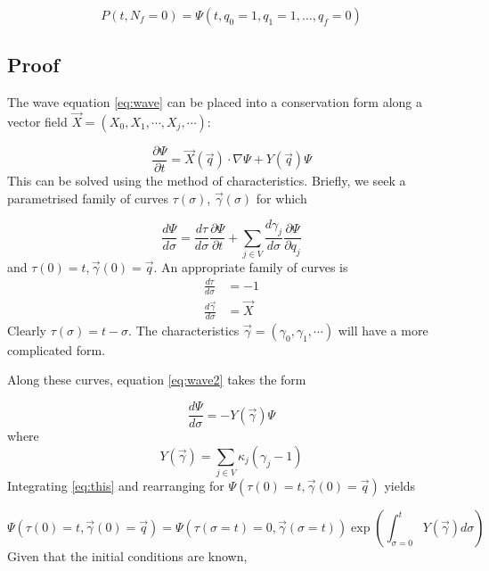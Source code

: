 \documentclass{article}
\begin{document}
\begin{equation}
    P(t,N_f=0) = \Psi(t,q_0 = 1, q_1 = 1, \dots, q_f = 0)
\end{equation}

\subsection*{Proof}

The wave equation \eqref{eq:wave} can be placed into a conservation form along a vector field
$\vec{X} = (X_0,X_1,\cdots,X_j,\cdots)$:

\begin{equation}
    \frac{\partial \Psi}{\partial t} = \vec{X}(\vec{q}) \cdot \nabla \Psi + Y(\vec{q}) \Psi
    \label{eq:wave2}
\end{equation}
This can be solved using the method of characteristics. Briefly, we seek a
parametrised family of curves $\tau(\sigma)$, $\vec{\gamma}(\sigma)$ for which

\begin{equation}
    \frac{d \Psi}{d \sigma} = \frac{d \tau}{d \sigma} \frac{\partial \Psi}{\partial t} 
    + \sum_{j \in V} \frac{d \gamma_j}{d \sigma} \frac{\partial \Psi}{\partial q_j}
\end{equation}
and $\tau(0) = t,\vec{\gamma}(0) = \vec{q}$. An appropriate family of curves is
\begin{align}
    \frac{d \tau}{d \sigma} &= -1
    \nonumber \\
    \frac{d \vec{\gamma}}{d \sigma} &= \vec{X}
    \nonumber
\end{align}
Clearly $\tau(\sigma) = t - \sigma$. The characteristics
$\vec{\gamma}=(\gamma_0,\gamma_1,\cdots)$ will have a more complicated form.

Along these curves, equation
\eqref{eq:wave2} takes the form

\begin{equation}
    \frac{d \Psi}{d \sigma} = -Y(\vec{\gamma}) \Psi
    \label{eq:this}
\end{equation}
where
\begin{equation}
    Y(\vec{\gamma}) = \sum_{j \in V}\kappa_j (\gamma_j - 1)
\end{equation}
Integrating \eqref{eq:this} and rearranging for $\Psi(\tau(0) = t, \vec{\gamma}(0) =
\vec{q})$ yields

\begin{equation}
    \Psi(\tau(0) = t, \vec{\gamma}(0) = \vec{q})
    = \Psi(\tau(\sigma = t) = 0, \vec{\gamma}(\sigma = t))
    \exp\left(\int_{\sigma=0}^t Y(\vec{\gamma}) d\sigma\right)
\end{equation}
Given that the initial conditions are known,
\end{document}

